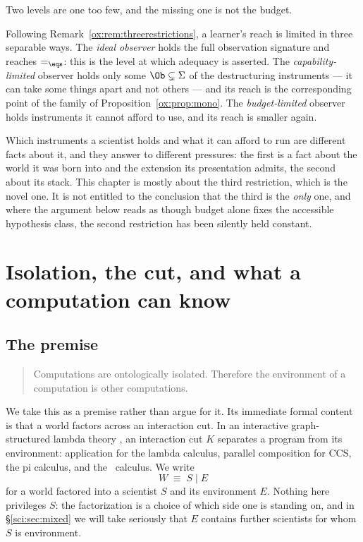 Two levels are one too few, and the missing one is not the budget.

\begin{remark}
\label{sci:rem:three-limits}
Following Remark~\ref{ox:rem:threerestrictions}, a learner's reach is limited in three separable ways.
The \emph{ideal observer} holds the full observation signature and reaches $=_{\eqs}$: this is the
level at which adequacy is asserted. The \emph{capability-limited} observer holds only some
$\Ob \subsetneq \Sigma$ of the destructuring instruments --- it can take some things apart and not
others --- and its reach is the corresponding point of the family of
Proposition~\ref{ox:prop:mono}. The \emph{budget-limited} observer holds instruments it cannot afford
to use, and its reach is smaller again.

Which instruments a scientist holds and what it can afford to run are different facts about it, and
they answer to different pressures: the first is a fact about the world it was born into and the
extension its presentation admits, the second about its stack. This chapter is mostly about the third
restriction, which is the novel one. It is not entitled to the conclusion that the third is the
\emph{only} one, and where the argument below reads as though budget alone fixes the accessible
hypothesis class, the second restriction has been silently held constant.
\end{remark}

\section{Isolation, the cut, and what a computation can know}\label{sci:S2}
\label{sci:sec:cut}

\subsection{The premise}\label{sci:S2.1}

\begin{quote}
Computations are ontologically isolated. Therefore the environment of a computation is other
computations.
\end{quote}

We take this as a premise rather than argue for it. Its immediate formal content is that a world
factors across an interaction cut. In an interactive graph-structured lambda theory \cite{Omnibus},
an interaction cut $K$ separates a program from its environment: application for the lambda calculus,
parallel composition for CCS, the pi calculus, and the \rhoc\ calculus. We write
\[
W \;\equiv\; S \mid E
\]
for a world factored into a scientist $S$ and its environment $E$. Nothing here privileges $S$: the
factorization is a choice of which side one is standing on, and in \S\ref{sci:sec:mixed} we will take
seriously that $E$ contains further scientists for whom $S$ is environment.

